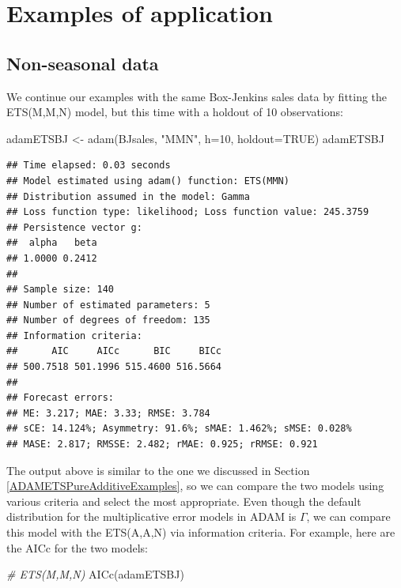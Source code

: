 \documentclass[
]{book}
\newenvironment{Shaded}{\begin{snugshade}}{\end{snugshade}}
\newcommand{\AttributeTok}[1]{\textcolor[rgb]{0.77,0.63,0.00}{#1}}
\newcommand{\CommentTok}[1]{\textcolor[rgb]{0.56,0.35,0.01}{\textit{#1}}}
\newcommand{\ConstantTok}[1]{\textcolor[rgb]{0.00,0.00,0.00}{#1}}
\newcommand{\DecValTok}[1]{\textcolor[rgb]{0.00,0.00,0.81}{#1}}
\newcommand{\FunctionTok}[1]{\textcolor[rgb]{0.00,0.00,0.00}{#1}}
\newcommand{\NormalTok}[1]{#1}
\newcommand{\OtherTok}[1]{\textcolor[rgb]{0.56,0.35,0.01}{#1}}
\newcommand{\StringTok}[1]{\textcolor[rgb]{0.31,0.60,0.02}{#1}}
\theoremstyle{definition}
\theoremstyle{definition}
\theoremstyle{definition}
\theoremstyle{definition}
\theoremstyle{remark}
\begin{document}
\hypertarget{ADAMETSMultiplicativeExamples}{%
\section{Examples of application}\label{ADAMETSMultiplicativeExamples}}

\hypertarget{non-seasonal-data-1}{%
\subsection{Non-seasonal data}\label{non-seasonal-data-1}}

We continue our examples with the same Box-Jenkins sales data by fitting the ETS(M,M,N) model, but this time with a holdout of 10 observations:

\begin{Shaded}
\begin{Highlighting}[]
\NormalTok{adamETSBJ }\OtherTok{\textless{}{-}} \FunctionTok{adam}\NormalTok{(BJsales, }\StringTok{"MMN"}\NormalTok{, }\AttributeTok{h=}\DecValTok{10}\NormalTok{, }\AttributeTok{holdout=}\ConstantTok{TRUE}\NormalTok{)}
\NormalTok{adamETSBJ}
\end{Highlighting}
\end{Shaded}

\begin{verbatim}
## Time elapsed: 0.03 seconds
## Model estimated using adam() function: ETS(MMN)
## Distribution assumed in the model: Gamma
## Loss function type: likelihood; Loss function value: 245.3759
## Persistence vector g:
##  alpha   beta 
## 1.0000 0.2412 
## 
## Sample size: 140
## Number of estimated parameters: 5
## Number of degrees of freedom: 135
## Information criteria:
##      AIC     AICc      BIC     BICc 
## 500.7518 501.1996 515.4600 516.5664 
## 
## Forecast errors:
## ME: 3.217; MAE: 3.33; RMSE: 3.784
## sCE: 14.124%; Asymmetry: 91.6%; sMAE: 1.462%; sMSE: 0.028%
## MASE: 2.817; RMSSE: 2.482; rMAE: 0.925; rRMSE: 0.921
\end{verbatim}

The output above is similar to the one we discussed in Section \ref{ADAMETSPureAdditiveExamples}, so we can compare the two models using various criteria and select the most appropriate. Even though the default distribution for the multiplicative error models in ADAM is \(\Gamma\), we can compare this model with the ETS(A,A,N) via information criteria. For example, here are the AICc for the two models:

\begin{Shaded}
\begin{Highlighting}[]
\CommentTok{\# ETS(M,M,N)}
\FunctionTok{AICc}\NormalTok{(adamETSBJ)}
\end{Highlighting}
\end{Shaded}
\end{document}

